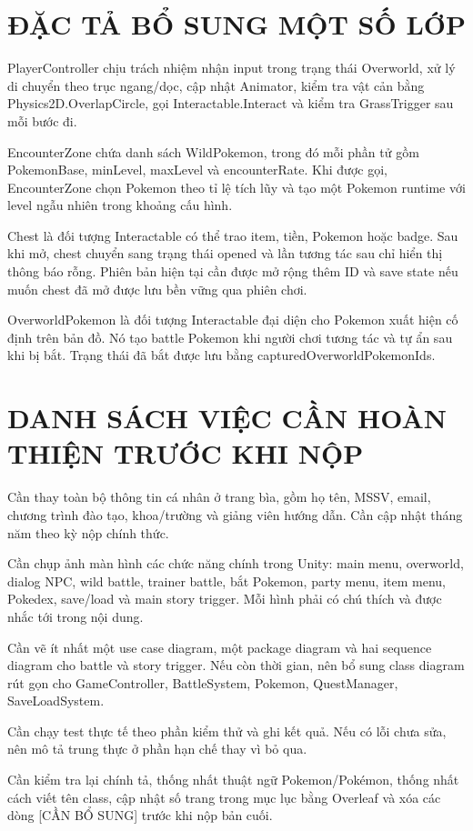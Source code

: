 \chapter{ĐẶC TẢ BỔ SUNG MỘT SỐ LỚP}

PlayerController chịu trách nhiệm nhận input trong trạng thái Overworld, xử lý di chuyển theo trục ngang/dọc, cập nhật Animator, kiểm tra vật cản bằng Physics2D.OverlapCircle, gọi Interactable.Interact và kiểm tra GrassTrigger sau mỗi bước đi.

EncounterZone chứa danh sách WildPokemon, trong đó mỗi phần tử gồm PokemonBase, minLevel, maxLevel và encounterRate. Khi được gọi, EncounterZone chọn Pokemon theo tỉ lệ tích lũy và tạo một Pokemon runtime với level ngẫu nhiên trong khoảng cấu hình.

Chest là đối tượng Interactable có thể trao item, tiền, Pokemon hoặc badge. Sau khi mở, chest chuyển sang trạng thái opened và lần tương tác sau chỉ hiển thị thông báo rỗng. Phiên bản hiện tại cần được mở rộng thêm ID và save state nếu muốn chest đã mở được lưu bền vững qua phiên chơi.

OverworldPokemon là đối tượng Interactable đại diện cho Pokemon xuất hiện cố định trên bản đồ. Nó tạo battle Pokemon khi người chơi tương tác và tự ẩn sau khi bị bắt. Trạng thái đã bắt được lưu bằng capturedOverworldPokemonIds.

\chapter{DANH SÁCH VIỆC CẦN HOÀN THIỆN TRƯỚC KHI NỘP}

Cần thay toàn bộ thông tin cá nhân ở trang bìa, gồm họ tên, MSSV, email, chương trình đào tạo, khoa/trường và giảng viên hướng dẫn. Cần cập nhật tháng năm theo kỳ nộp chính thức.

Cần chụp ảnh màn hình các chức năng chính trong Unity: main menu, overworld, dialog NPC, wild battle, trainer battle, bắt Pokemon, party menu, item menu, Pokedex, save/load và main story trigger. Mỗi hình phải có chú thích và được nhắc tới trong nội dung.

Cần vẽ ít nhất một use case diagram, một package diagram và hai sequence diagram cho battle và story trigger. Nếu còn thời gian, nên bổ sung class diagram rút gọn cho GameController, BattleSystem, Pokemon, QuestManager, SaveLoadSystem.

Cần chạy test thực tế theo phần kiểm thử và ghi kết quả. Nếu có lỗi chưa sửa, nên mô tả trung thực ở phần hạn chế thay vì bỏ qua.

Cần kiểm tra lại chính tả, thống nhất thuật ngữ Pokemon/Pokémon, thống nhất cách viết tên class, cập nhật số trang trong mục lục bằng Overleaf và xóa các dòng [CẦN BỔ SUNG] trước khi nộp bản cuối.
